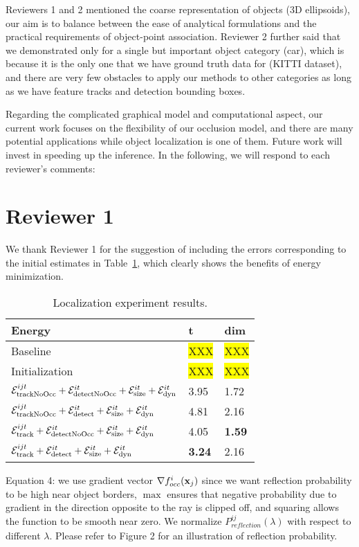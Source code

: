 \documentclass[10pt,twocolumn,letterpaper]{article}
\newcommand{\hili}[1]{\colorbox{yellow}{#1}}
\begin{document}
Reviewers 1 and 2 mentioned the coarse representation of objects (3D ellipsoids), our aim is to balance between the ease of analytical formulations and the practical requirements of object-point association. Reviewer 2 further said that we demonstrated only for a single but important object category (car), which is because it is the only one that we have ground truth data for (KITTI dataset), and there are very few obstacles to apply our methods to other categories as long as we have feature tracks and detection bounding boxes.

Regarding the complicated graphical model and computational aspect, our current work focuses on the flexibility of our occlusion model, and there are many potential applications while object localization is one of them. Future work will invest in speeding up the inference. In the following, we will respond to each reviewer's comments:

\section{Reviewer 1}

We thank Reviewer 1 for the suggestion of including the errors corresponding to the initial estimates in Table~\ref{tab:localization}, which clearly shows the benefits of energy minimization.   

\begin{table}\centering\footnotesize
\begin{tabular}{|l|l|l|}
\hline
Energy & t & dim \\
\hline
\hline
Baseline & \hili{XXX} & \hili{XXX} \\
Initialization & \hili{XXX} & \hili{XXX} \\
$\mathcal{E}^{ijt}_{\text{trackNoOcc}} + \mathcal{E}^{it}_{\text{detectNoOcc}} +\mathcal{E}^{it}_{\text{size}}+\mathcal{E}^{it}_{\text{dyn}}$ 
& 3.95  & 1.72\\        
$\mathcal{E}^{ijt}_{\text{trackNoOcc}} + \mathcal{E}^{it}_{\text{detect}} +\mathcal{E}^{it}_{\text{size}}+\mathcal{E}^{it}_{\text{dyn}}$        
& 4.81  & 2.16\\        
$\mathcal{E}^{ijt}_{\text{track}} + \mathcal{E}^{it}_{\text{detectNoOcc}} +\mathcal{E}^{it}_{\text{size}}+\mathcal{E}^{it}_{\text{dyn}}$      
& 4.05  & {\bf 1.59}\\        
$\mathcal{E}^{ijt}_{\text{track}} + \mathcal{E}^{it}_{\text{detect}} +\mathcal{E}^{it}_{\text{size}}+\mathcal{E}^{it}_{\text{dyn}}$             
& {\bf 3.24}  & 2.16\\
\hline
\end{tabular}
\caption{Localization experiment results.}
\label{tab:localization}
\end{table}

Equation 4: we use gradient vector $\nabla {f^i_{occ}}(\mathbf{x}_j)$ since we want reflection probability to be high near object borders, $\max$ ensures that negative probability due to gradient in the direction opposite to the ray is clipped off, and squaring allows the function to be smooth near zero. We normalize $P^{ij}_{\textit{reflection}}(\lambda)$  with respect to different $\lambda$. Please refer to Figure 2 for an illustration of reflection probability.
\end{document}
